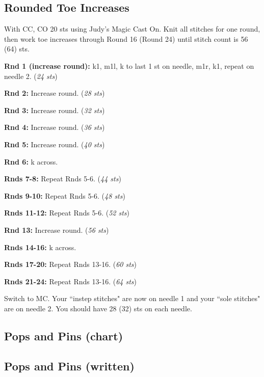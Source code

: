 \documentclass[12pt]{article}
\newcommand{\rowDir}[1]{\textbf{#1:}} %
\newcommand{\stitchcount}[1]{(\emph{#1 sts})}
\newenvironment{unframed}
    {%
	\begin{addmargin}[2em]{0pt}
	\setlength{\parindent}{-2em}}
    {\vspace{1em}
	\setlength{\parindent}{0em}
	\end{addmargin}}
\begin{document}
\begin{multicols}{2}
\subsection*{Rounded Toe Increases}

With CC, CO 20 sts using Judy's Magic Cast On. Knit all stitches for one round, then work toe increases through Round 16 (Round 24) until stitch count is 56 (64) sts.
\begin{unframed}
\hspace{-2em}\rowDir{Rnd 1 (increase round)} k1, m1l, k to last 1 st on needle, m1r, k1, repeat on needle 2. \stitchcount{24}

\rowDir{Rnd 2} Increase round. \stitchcount{28}

\rowDir{Rnd 3} Increase round. \stitchcount{32}

\rowDir{Rnd 4} Increase round. \stitchcount{36}

\rowDir{Rnd 5} Increase round. \stitchcount{40}

\rowDir{Rnd 6} k across.

\rowDir{Rnds 7-8} Repeat Rnds 5-6. \stitchcount{44}

\rowDir{Rnds 9-10} Repeat Rnds 5-6. \stitchcount{48}

\rowDir{Rnds 11-12} Repeat Rnds 5-6. \stitchcount{52}

\rowDir{Rnd 13} Increase round. \stitchcount{56}

\rowDir{Rnds 14-16} k across.

\rowDir{Rnds 17-20} Repeat Rnds 13-16. \stitchcount{60}

\rowDir{Rnds 21-24} Repeat Rnds 13-16. \stitchcount{64}
\end{unframed}

Switch to MC. Your ``instep stitches" are now on needle 1 and your ``sole stitches" are on needle 2. You should have 28 (32) sts on each needle.

\small
\subsection*{Pops and Pins (chart)}


\subsection*{Pops and Pins (written)}


\end{multicols}
\end{document}
